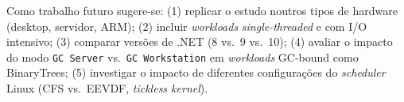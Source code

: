 \documentclass[12pt,a4paper]{article}
\begin{document}
Como trabalho futuro sugere-se:
(1) replicar o estudo noutros tipos de hardware (desktop, servidor, ARM);
(2) incluir \textit{workloads} \textit{single-threaded} e com I/O intensivo;
(3) comparar versões de .NET (8 vs.\ 9 vs.\ 10);
(4) avaliar o impacto do modo \texttt{GC Server} vs.\ \texttt{GC Workstation}
em \textit{workloads} GC-bound como BinaryTrees;
(5) investigar o impacto de diferentes configurações do \textit{scheduler}
Linux (CFS vs.\ EEVDF, \textit{tickless kernel}).



\end{document}
